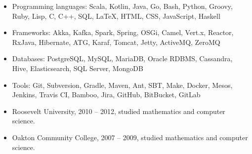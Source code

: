 \documentclass{harnon-cv}
\begin{document}
\timelinespacer


\timelinespacer


\stoptimeline

\begin{itemize}
    \item Programming languages: Scala, Kotlin, Java, Go, Bash, Python, Groovy, Ruby, Lisp, C, C++, SQL, \LaTeX, HTML, CSS, JavaScript, Haskell
    \item Frameworks: Akka, Kafka, Spark, Spring, OSGi, Camel, Vert.x, Reactor, RxJava, Hibernate, ATG, Karaf, Tomcat, Jetty, ActiveMQ, ZeroMQ
    \item Databases: PostgreSQL, MySQL, MariaDB, Oracle RDBMS, Cassandra, Hive, Elasticsearch, SQL Server, MongoDB
    \item Tools: Git, Subversion, Gradle, Maven, Ant, SBT, Make, Docker, Mesos, Jenkins, Travis CI, Bamboo, Jira, GitHub, BitBucket, GitLab
\end{itemize}


\begin{itemize}
    \item Roosevelt University, 2010 -- 2012, studied mathematics and computer science.
    \item Oakton Community College, 2007 -- 2009, studied mathematics and computer science.
\end{itemize}
\end{document}
